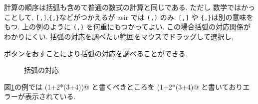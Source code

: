 \documentclass{jbook}
\begin{document}
計算の順序は括弧も含めて普通の数式の計算と同じである. 
ただし
数学ではかっことして, {\tt [,]},{\tt \{,\}}などがつかえるが
asir では {\tt (,)} のみ.
{\tt [,]} や {\tt \{,\}}は別の意味をもつ.
上の例のように {\tt (,)} を何重にもつかってよい.
この場合括弧の対応関係がわかりにくい.
括弧の対応を調べたい範囲をマウスでドラッグして選択し,
\begin{center}
\end{center}
ボタンをおすことにより括弧の対応を調べることができる.
\begin{figure}[tb]
\begin{center}
\end{center}
\caption{括弧の対応} \label{fig:menuCheckBracket}
\end{figure}
図\ref{fig:menuCheckBracket}の例では \verb@(1+2*(3+4))@ と書くべきところを
\verb@(1+2*(3+4)@ と書いておりエラーが表示されている. 
\end{document}
